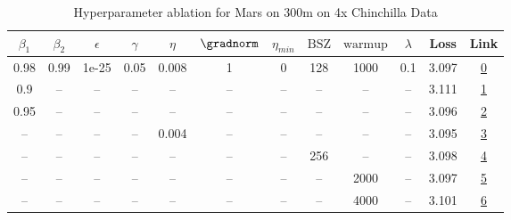 \begin{table}[H]
\centering
\caption{Hyperparameter ablation for Mars on 300m on 4x Chinchilla Data}
\label{tab:ablation_mars_300m_on_4x_chinchilla_data}
\begin{tabular}{cccccccccccc}
\toprule
$\beta_1$ & $\beta_2$ & $\epsilon$ & $\gamma$ & $\eta$ & $\gradnorm$ & $\eta_{min}$ & $\mathrm{BSZ}$ & $\mathrm{warmup}$ & $\lambda$ & Loss & Link \\
\midrule
0.98 & 0.99 & 1e-25 & 0.05 & 0.008 & 1 & 0 & 128 & 1000 & 0.1 & 3.097 & \href{https://wandb.ai/stanford-mercury/optimizer-scaling/runs/sweep-300m-24B-mars3a0394lr0.008-wd0.1-minlr0-warmup1000-b10.98--79e319}{0} \\
\midrule
0.9 & -- & -- & -- & -- & -- & -- & -- & -- & -- & 3.111 & \href{https://wandb.ai/stanford-mercury/optimizer-scaling/runs/sweep-300m-24B-mars4adeb3lr0.008-wd0.1-minlr0-warmup1000-b10.9-b-56d9fa}{1} \\
0.95 & -- & -- & -- & -- & -- & -- & -- & -- & -- & 3.096 & \href{https://wandb.ai/stanford-mercury/optimizer-scaling/runs/sweep-300m-24B-mars0c24e7lr0.008-wd0.1-minlr0-warmup1000-b10.95--e508fb}{2} \\
-- & -- & -- & -- & 0.004 & -- & -- & -- & -- & -- & 3.095 & \href{https://wandb.ai/stanford-mercury/optimizer-scaling/runs/sweep-300m-24B-mars98645clr0.004-wd0.1-minlr0-warmup1000-b10.98--72b012}{3} \\
-- & -- & -- & -- & -- & -- & -- & 256 & -- & -- & 3.098 & \href{https://wandb.ai/stanford-mercury/optimizer-scaling/runs/sweep-300m-24B-marsbb066blr0.008-wd0.1-minlr0-warmup1000-b10.98--71162e}{4} \\
-- & -- & -- & -- & -- & -- & -- & -- & 2000 & -- & 3.097 & \href{https://wandb.ai/stanford-mercury/optimizer-scaling/runs/sweep-300m-24B-mars3f97e6lr0.008-wd0.1-minlr0-warmup2000-b10.98--d090a1}{5} \\
-- & -- & -- & -- & -- & -- & -- & -- & 4000 & -- & 3.101 & \href{https://wandb.ai/stanford-mercury/optimizer-scaling/runs/sweep-300m-24B-mars9edcd4lr0.008-wd0.1-minlr0-warmup4000-b10.98--b278a3}{6} \\
\bottomrule
\end{tabular}
\end{table}


